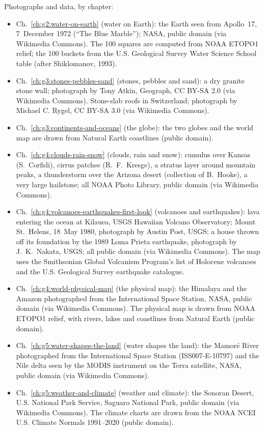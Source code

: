 \bigskip
\noindent Photographs and data, by chapter:
\begin{itemize}\small
  \item Ch.~\ref{ch:g2:water-on-earth} (water on Earth): the Earth seen from Apollo~17, 7~December 1972 (``The Blue Marble''); NASA, public domain (via Wikimedia Commons). The 100 squares are computed from NOAA ETOPO1 relief; the 100 buckets from the U.S. Geological Survey Water Science School table (after Shiklomanov, 1993).
  \item Ch.~\ref{ch:g3:stones-pebbles-sand} (stones, pebbles and sand): a dry granite stone wall; photograph by Tony Atkin, Geograph, CC BY-SA 2.0 (via Wikimedia Commons). Stone-slab roofs in Switzerland; photograph by Michael C. Rygel, CC BY-SA 3.0 (via Wikimedia Commons).
  \item Ch.~\ref{ch:g3:continents-and-oceans} (the globe): the two globes and the world map are drawn from Natural Earth coastlines (public domain).
  \item Ch.~\ref{ch:g4:clouds-rain-snow} (clouds, rain and snow): cumulus over Kansas (S.~Corfidi), cirrus patches (R.~F.~Kresge), a stratus layer around mountain peaks, a thunderstorm over the Arizona desert (collection of B.~Hooke), a very large hailstone; all NOAA Photo Library, public domain (via Wikimedia Commons).
  \item Ch.~\ref{ch:g4:volcanoes-earthquakes-first-look} (volcanoes and earthquakes): lava entering the ocean at Kilauea, USGS Hawaiian Volcano Observatory; Mount St.~Helens, 18~May 1980, photograph by Austin Post, USGS; a house thrown off its foundation by the 1989 Loma Prieta earthquake, photograph by J.~K.~Nakata, USGS; all public domain (via Wikimedia Commons). The map uses the Smithsonian Global Volcanism Program's list of Holocene volcanoes and the U.S. Geological Survey earthquake catalogue.
  \item Ch.~\ref{ch:g4:world-physical-map} (the physical map): the Himalaya and the Amazon photographed from the International Space Station, NASA, public domain (via Wikimedia Commons). The physical map is drawn from NOAA ETOPO1 relief, with rivers, lakes and coastlines from Natural Earth (public domain).
  \item Ch.~\ref{ch:g5:water-shapes-the-land} (water shapes the land): the Mamoré River photographed from the International Space Station (ISS007-E-10797) and the Nile delta seen by the MODIS instrument on the Terra satellite, NASA, public domain (via Wikimedia Commons).
  \item Ch.~\ref{ch:g5:weather-and-climate} (weather and climate): the Sonoran Desert, U.S. National Park Service, Saguaro National Park, public domain (via Wikimedia Commons). The climate charts are drawn from the NOAA NCEI U.S. Climate Normals 1991--2020 (public domain).

\end{itemize}
